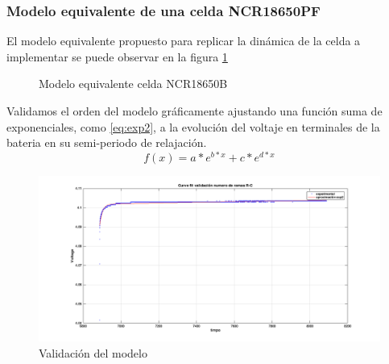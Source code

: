 \documentclass[10pt]{beamer}
\theoremstyle{remark}
\theoremstyle{definition}
\begin{document}
\begin{frame}[allowframebreaks]
  \frametitle{Modelo equivalente de una celda NCR18650PF}
  El modelo equivalente propuesto para replicar la dinámica de la celda a
  implementar se puede observar en la figura \ref{fig:ModeloBat}
  
  \begin{figure}
	\begin{center}
	  \caption{Modelo equivalente celda NCR18650B}
	  \label{fig:ModeloBat}
	\end{center}
  \end{figure}
  
\begin{minipage}{0.45\linewidth}
  Validamos el orden del modelo gráficamente ajustando una función 
  suma de exponenciales, como \ref{eq:exp2}, a la evolución del 
  voltaje en terminales de la bateria en su semi-periodo de relajación.
  \begin{equation}
	f(x) = a*e^{b*x} + c*e^{d*x}
	\label{eq:exp2}
  \end{equation}
\end{minipage}\hfill
\begin{minipage}{0.45\linewidth}
  \begin{figure}[h!]
	\centering
	\includegraphics[width=1.3\linewidth]{images/exp_ord_2_val.png}
	\caption{Validación del modelo}
	\label{fig:val_exp2}
  \end{figure}
\end{minipage}
\end{frame}
\end{document}

